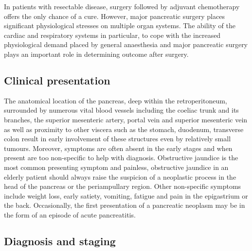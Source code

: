 In patients with resectable disease, surgery \parencite{sener_pancreatic_1999, sohn_resected_2000,geer_prognostic_1993} followed by adjuvant chemotherapy \parencite{neoptolemos_randomized_2004, neoptolemos_adjuvant_2009} offers the only chance of a cure. 
However, major pancreatic surgery places significant physiological stresses on multiple organ systems. 
The ability of the cardiac and respiratory systems in particular, to cope with the increased physiological demand placed by general anaesthesia and major pancreatic surgery plays an important role in determining outcome after surgery.

\subsection{Clinical presentation}

The anatomical location of the pancreas, deep within the retroperitoneum, surrounded by numerous vital blood vessels including the coeliac trunk and its branches, the superior mesenteric artery, portal vein and superior mesenteric vein as well as proximity to other viscera such as the stomach, duodenum, transverse colon result in early involvement of these structures even by relatively small tumours. 
Moreover, symptoms are often absent in the early stages and when present are too non-specific to help with diagnosis. 
Obstructive jaundice is the most common presenting symptom and painless, obstructive jaundice in an elderly patient should always raise the suspicion of a neoplastic process in the head of the pancreas or the periampullary region. 
Other non-specific symptoms include weight loss, early satiety, vomiting, fatigue and pain in the epigastrium or the back. 
Occasionally, the first presentation of a pancreatic neoplasm may be in the form of an episode of acute pancreatitis.
 
\subsection{Diagnosis and staging}

